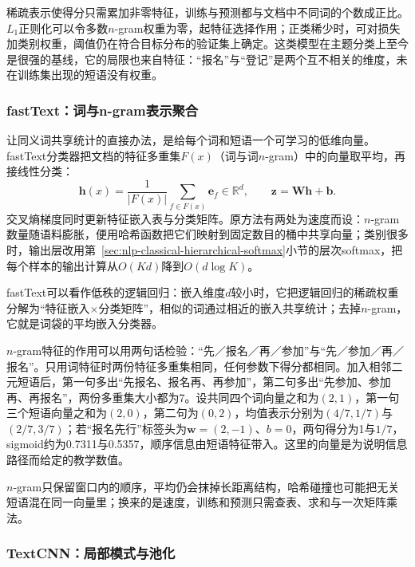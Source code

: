 稀疏表示使得分只需累加非零特征，训练与预测都与文档中不同词的个数成正比。$L_1$正则化可以令多数$n$-gram权重为零，起特征选择作用；正类稀少时，可对损失加类别权重，阈值仍在符合目标分布的验证集上确定。这类模型在主题分类上至今是很强的基线，它的局限也来自特征：“报名”与“登记”是两个互不相关的维度，未在训练集出现的短语没有权重。

\subsubsection{fastText：词与n-gram表示聚合}
\label{sec:nlp-classification-fasttext}

让同义词共享统计的直接办法，是给每个词和短语一个可学习的低维向量。fastText分类器把文档的特征多重集$F(x)$（词与词$n$-gram）中的向量取平均，再接线性分类：
\[
  \bm h(x)=\frac{1}{|F(x)|}\sum_{f\in F(x)}\bm e_f\in\mathbb R^{d},\qquad
  \bm z=\bm W\bm h+\bm b.
\]
交叉熵梯度同时更新特征嵌入表与分类矩阵。原方法有两处为速度而设：$n$-gram数量随语料膨胀，便用哈希函数把它们映射到固定数目的桶中共享向量；类别很多时，输出层改用第~\ref{sec:nlp-classical-hierarchical-softmax}小节的层次softmax，把每个样本的输出计算从$O(Kd)$降到$O(d\log K)$。

fastText可以看作低秩的逻辑回归：嵌入维度$d$较小时，它把逻辑回归的稀疏权重分解为“特征嵌入$\times$分类矩阵”，相似的词通过相近的嵌入共享统计；去掉$n$-gram，它就是词袋的平均嵌入分类器。

$n$-gram特征的作用可以用两句话检验：“先／报名／再／参加”与“先／参加／再／报名”。只用词特征时两份特征多重集相同，任何参数下得分都相同。加入相邻二元短语后，第一句多出“先报名、报名再、再参加”，第二句多出“先参加、参加再、再报名”，两份多重集大小都为7。设共同四个词向量之和为$(2,1)$，第一句三个短语向量之和为$(2,0)$，第二句为$(0,2)$，均值表示分别为$(4/7,1/7)$与$(2/7,3/7)$；若“报名先行”标签头为$\bm w=(2,-1)$、$b=0$，两句得分为1与$1/7$，sigmoid约为0.7311与0.5357，顺序信息由短语特征带入。这里的向量是为说明信息路径而给定的教学数值。

$n$-gram只保留窗口内的顺序，平均仍会抹掉长距离结构，哈希碰撞也可能把无关短语混在同一向量里；换来的是速度，训练和预测只需查表、求和与一次矩阵乘法。

\subsubsection{TextCNN：局部模式与池化}
\label{sec:nlp-classification-textcnn}

